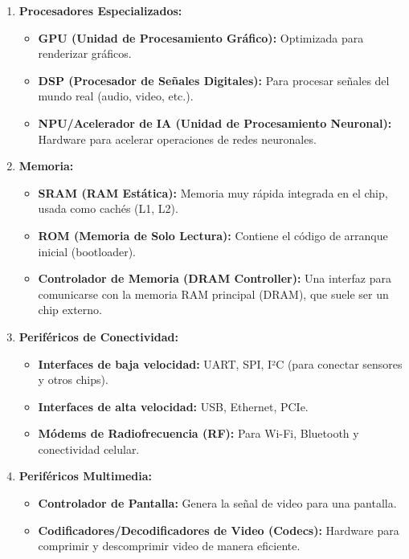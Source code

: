 \documentclass[12pt,a4paper]{article}
\begin{document}
\begin{enumerate}
    \item \textbf{Procesadores Especializados:}
    \begin{itemize}
        \item \textbf{GPU (Unidad de Procesamiento Gráfico):} Optimizada para renderizar gráficos.
        \item \textbf{DSP (Procesador de Señales Digitales):} Para procesar señales del mundo real (audio, video, etc.).
        \item \textbf{NPU/Acelerador de IA (Unidad de Procesamiento Neuronal):} Hardware para acelerar operaciones de redes neuronales.
    \end{itemize}

    \item \textbf{Memoria:}
    \begin{itemize}
        \item \textbf{SRAM (RAM Estática):} Memoria muy rápida integrada en el chip, usada como cachés (L1, L2).
        \item \textbf{ROM (Memoria de Solo Lectura):} Contiene el código de arranque inicial (bootloader).
        \item \textbf{Controlador de Memoria (DRAM Controller):} Una interfaz para comunicarse con la memoria RAM principal (DRAM), que suele ser un chip externo.
    \end{itemize}

    \item \textbf{Periféricos de Conectividad:}
    \begin{itemize}
        \item \textbf{Interfaces de baja velocidad:} UART, SPI, I²C (para conectar sensores y otros chips).
        \item \textbf{Interfaces de alta velocidad:} USB, Ethernet, PCIe.
        \item \textbf{Módems de Radiofrecuencia (RF):} Para Wi-Fi, Bluetooth y conectividad celular.
    \end{itemize}

    \item \textbf{Periféricos Multimedia:}
    \begin{itemize}
        \item \textbf{Controlador de Pantalla:} Genera la señal de video para una pantalla.
        \item \textbf{Codificadores/Decodificadores de Video (Codecs):} Hardware para comprimir y descomprimir video de manera eficiente.
    \end{itemize}


\end{enumerate}
\end{document}
